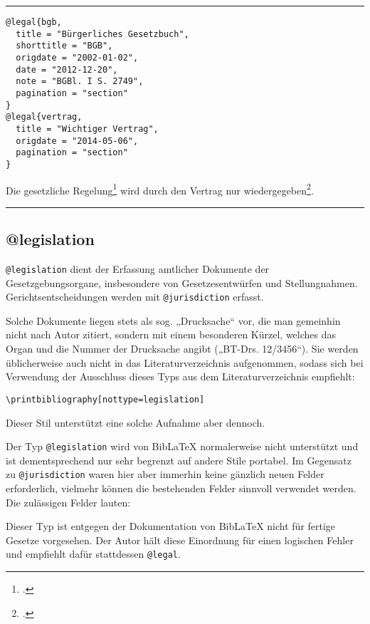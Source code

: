 \documentclass[11pt,a4paper,DIV=calc,draft]{scrartcl}
\newcommand\software[1]{\textsf{#1}}
\newcommand\Biblatex{\software{Bib\LaTeX{}}\xspace}
\newenvironment{rubexample}{\par\vspace{\baselineskip}\hrule\par\begin{refsection}}{\end{refsection}\par\hrule\par\vspace{\baselineskip}}
\begin{document}
\begin{rubexample}
\begin{verbatim}
@legal{bgb,
  title = "Bürgerliches Gesetzbuch",
  shorttitle = "BGB",
  origdate = "2002-01-02",
  date = "2012-12-20",
  note = "BGBl. I S. 2749",
  pagination = "section"
}
@legal{vertrag,
  title = "Wichtiger Vertrag",
  origdate = "2014-05-06",
  pagination = "section"
}
\end{verbatim}

Die gesetzliche Regelung\footcite[582]{bgb} wird durch den Vertrag nur
wiedergegeben\footcite[11]{vertrag}.

\printbibliography
\end{rubexample}

\subsection{@legislation}

\verb+@legislation+ dient der Erfassung amtlicher Dokumente der
Gesetzgebungsorgane, insbesondere von Gesetzesentwürfen und
Stellungnahmen. Gerichtsentscheidungen werden mit \verb+@jurisdiction+
erfasst.

Solche Dokumente liegen stets als sog. „Drucksache“ vor, die man
gemeinhin nicht nach Autor zitiert, sondern mit einem besonderen
Kürzel, welches das Organ und die Nummer der Drucksache angibt
(„BT-Drs. 12/3456“). Sie werden üblicherweise auch nicht in das
Literaturverzeichnis aufgenommen, sodass sich bei Verwendung der
Ausschluss dieses Typs aus dem Literaturverzeichnis empfiehlt:

\begin{verbatim}
\printbibliography[nottype=legislation]
\end{verbatim}

Dieser Stil unterstützt eine solche Aufnahme aber dennoch.

Der Typ \verb+@legislation+ wird von \Biblatex normalerweise nicht
unterstützt und ist dementsprechend nur sehr begrenzt auf andere Stile
portabel. Im Gegensatz zu \verb+@jurisdiction+ waren hier aber
immerhin keine gänzlich neuen Felder erforderlich, vielmehr können die
bestehenden Felder sinnvoll verwendet werden. Die zulässigen Felder
lauten:

Dieser Typ ist entgegen der Dokumentation von \Biblatex nicht für
fertige Gesetze vorgesehen. Der Autor hält diese Einordnung für einen
logischen Fehler und empfiehlt dafür stattdessen \verb+@legal+.
\end{document}
